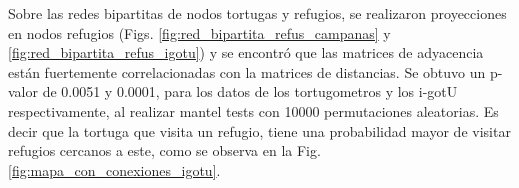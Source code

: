 Sobre las redes bipartitas de nodos tortugas y refugios, se realizaron proyecciones en nodos refugios (Figs. \ref{fig:red_bipartita_refus_campanas} y \ref{fig:red_bipartita_refus_igotu}) y se encontró que las matrices de adyacencia están fuertemente correlacionadas con la matrices de distancias. Se obtuvo un p-valor de 0.0051 y 0.0001, para los datos de los tortugometros y los i-gotU respectivamente, al realizar mantel tests con 10000 permutaciones aleatorias. Es decir que la tortuga que visita un refugio, tiene una probabilidad mayor de visitar refugios cercanos a este, como se observa en la Fig. \ref{fig:mapa_con_conexiones_igotu}.
 
 
 
 
 
 
 
 
 
 
 
 
 
 

